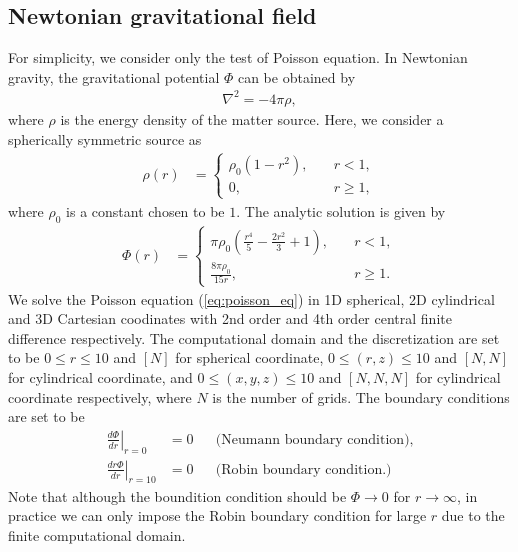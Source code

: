 \subsection{Newtonian gravitational field}
For simplicity, we consider only the test of Poisson equation.
In Newtonian gravity, the gravitational potential $\Phi$ can be obtained by
\begin{align}\label{eq:poisson_eq}
    \nabla^2 = - 4\pi \rho,
\end{align}
where $\rho$ is the energy density of the matter source.
Here, we consider a spherically symmetric source as
\begin{align}
    \rho(r) &= 
    \begin{cases}
        \rho_0 \left(1-r^2 \right), \quad & r<1,\\
        0, \quad & r\geq 1,
    \end{cases}
\end{align}
where $\rho_0$ is a constant chosen to be $1$.
The analytic solution is given by
\begin{align}
    \Phi(r) &=
    \begin{cases}
        \pi \rho_0 \left(\frac{r^4}{5} - \frac{2 r^2}{3} + 1 \right), \quad & r<1, \\
        \frac{8 \pi \rho_0}{15 r}, \quad & r\geq 1.
    \end{cases}
\end{align}
We solve the Poisson equation (\ref{eq:poisson_eq}) 
in 1D spherical, 2D cylindrical and 3D Cartesian coodinates
with 2nd order and 4th order central finite difference respectively.
The computational domain and the discretization are set to be
$0\leq r \leq 10$ and $[N]$ for spherical coordinate,
$0\leq (r,z) \leq 10$ and $[N,N]$ for cylindrical coordinate, and
$0\leq (x,y,z) \leq 10$ and $[N,N,N]$ for cylindrical coordinate respectively,
where $N$ is the number of grids.
The boundary conditions are set to be
\begin{align}
    \left. \frac{d \Phi}{d r} \right|_{r=0} &= 0 && \text{(Neumann boundary condition)}, \\
    \left. \frac{d r\Phi}{dr} \right|_{r=10} &= 0 && \text{(Robin boundary condition.)}
\end{align}
Note that although the boundition condition should be $\Phi \rightarrow 0$ for $r \rightarrow \infty$,
in practice we can only impose the Robin boundary condition for large $r$ due to the finite computational domain.

